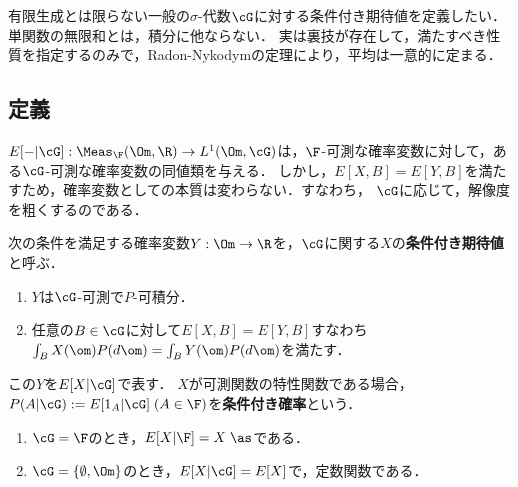 \documentclass[uplatex,dvipdfmx]{jsreport}
\begin{document}
\begin{discussion}[測度論的議論]
    有限生成とは限らない一般の$\sigma$-代数$\cG$に対する条件付き期待値を定義したい．
    単関数の無限和とは，積分に他ならない．
    実は裏技が存在して，満たすべき性質を指定するのみで，Radon-Nykodymの定理により，平均は一意的に定まる．
\end{discussion}

\subsection{定義}

\begin{tcolorbox}[colframe=ForestGreen, colback=ForestGreen!10!white,breakable,colbacktitle=ForestGreen!40!white,coltitle=black,fonttitle=\bfseries\sffamily,
title=]
    $E[-|\cG]:\Meas_\F(\Om,\R)\to L^1(\Om,\cG)$は，$\F$-可測な確率変数に対して，ある$\cG$-可測な確率変数の同値類を与える．
    しかし，$E[X,B]=E[Y,B]$を満たすため，確率変数としての本質は変わらない．すなわち，
    $\cG$に応じて，解像度を粗くするのである．
\end{tcolorbox}

\begin{definition}
    次の条件を満足する確率変数$Y:\Om\to\R$を，$\cG$に関する$X$の\textbf{条件付き期待値}と呼ぶ．
    \begin{enumerate}
        \item $Y$は$\cG$-可測で$P$-可積分．
        \item 任意の$B\in\cG$に対して$E[X,B]=E[Y,B]$すなわち$\int_BX(\om)P(d\om)=\int_BY(\om)P(d\om)$を満たす．
    \end{enumerate}
    この$Y$を$E[X|\cG]$で表す．
    $X$が可測関数の特性関数である場合，$P(A|\cG):=E[1_A|\cG]\;(A\in\F)$を\textbf{条件付き確率}という．
\end{definition}

\begin{example}[自明な例]\mbox{}
    \begin{enumerate}
        \item $\cG=\F$のとき，$E[X|\F]=X\;\as$である．
        \item $\cG=\{\emptyset,\Om\}$のとき，$E[X|\cG]=E[X]$で，定数関数である．
    \end{enumerate}
\end{example}
\end{document}
